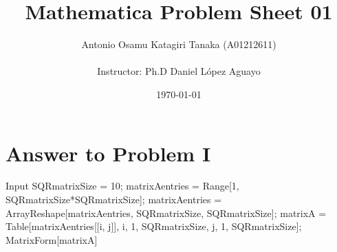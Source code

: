 \documentclass[11pt,a4paper]{article}
\title
{
    Mathematica Problem Sheet 01
}
\author
{    
    Antonio Osamu Katagiri Tanaka (A01212611) \\
    \\
    Instructor: Ph.D Daniel L{\' o}pez Aguayo
}
\date{\today}
\providecommand{\keywords}[1]
{
    \\
    \\
    \small
    \textbf{\textit{Keywords:}} #1
}
\begin{document}
\setlength\parindent{0pt} %


\maketitle


\clearpage








\section{Answer to Problem I}\label{sec:P01}

\begin{mmaCell}[morefunctionlocal={i, j}]{Input}
SQRmatrixSize = 10;
matrixAentries = Range[1, SQRmatrixSize*SQRmatrixSize];
matrixAentries = 
  ArrayReshape[matrixAentries, {SQRmatrixSize, SQRmatrixSize}];
matrixA = 
  Table[matrixAentries[[i, j]], {i, 1, SQRmatrixSize}, {j, 1, 
    SQRmatrixSize}];
MatrixForm[matrixA]
\end{mmaCell}
\end{document}

